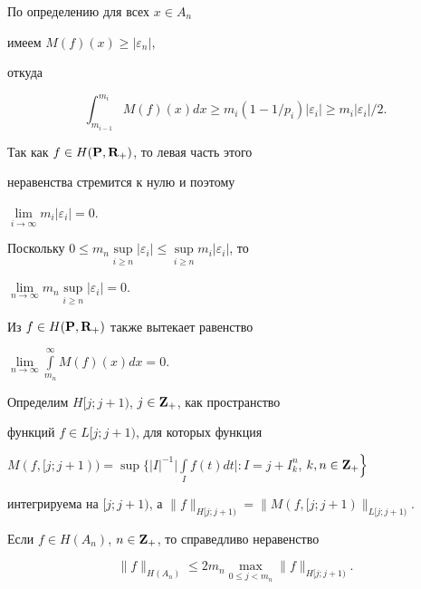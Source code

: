 \begin{pf}


По определению для всех $x\in A_n$ 


имеем $M(f)(x)\geq|\varepsilon_n|$, 


откуда


$$


\int^{m_i}_{m_{i-1}}M(f)(x)dx\geq


m_i(1-1/p_i)|\varepsilon_i|\geq m_i|\varepsilon_i|/2.


$$


Так как $f\in H({\bold P},{\bold R}_+)$, то левая часть этого 


неравенства стремится к нулю и поэтому


$\lim\limits_{i\to\infty}m_i|\varepsilon_i|=0$.


Поскольку $0\leq m_n\sup\limits_{i\geq n}|\varepsilon_i|


\leq \sup\limits_{i\geq n}m_i|\varepsilon_i|$, то


$\lim\limits_{n\to\infty}m_n\sup\limits_{i\geq n}|\varepsilon_i|=0$.


Из $f\in H({\bold P},{\bold R}_+)$ также вытекает равенство


$\lim\limits_{n\to\infty}


\int\limits^{\infty}_{m_n}M(f)(x)dx=0$.


\end{pf}


 


Определим $H[j;j+1)$, $j\in\bold Z_+$, как пространство


функций $f\in L[j;j+1)$, для которых функция


$M(f,[j;j+1))=\sup\Big\{|I|^{-1}\Big|\int\limits_If(t)dt\Big|:


I=j+I^n_k$, $k,n\in{\bold Z}_+\Big\}$


интегрируема на $[j;j+1)$, а $\|f\|_{H[j;j+1)}=\|M(f,[j;j+1)\|_{L[j;j+1)}$.








\begin{lems}


Если $f\in H(A_n)$, $n\in\bold Z_+$, то справедливо неравенство


$$


\|f\|_{H(A_n)}\leq 2m_n\max_{0\leq j<m_n}\|f\|_{H[j;j+1)}.


$$


\end{lems}








